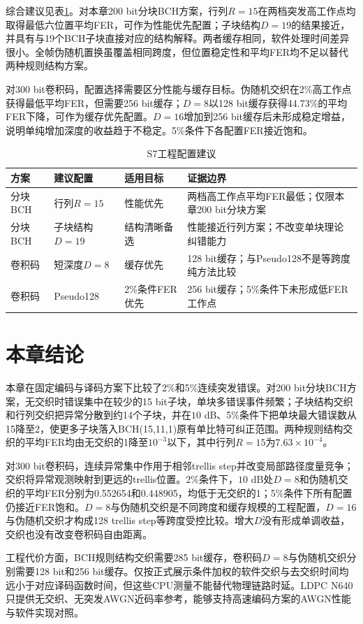 综合建议见表\ref{tab:s7-engineering-recommendation}。对本章200 bit分块BCH方案，行列$R=15$在两档突发高工作点均取得最低六位置平均FER，可作为性能优先配置；子块结构$D=19$的结果接近，并具有与19个BCH子块直接对应的结构解释。两者缓存相同，软件处理时间差异很小。全帧伪随机置换虽覆盖相同跨度，但位置稳定性和平均FER均不足以替代两种规则结构方案。

对300 bit卷积码，配置选择需要区分性能与缓存目标。伪随机交织在2\%高工作点获得最低平均FER，但需要256 bit缓存；$D=8$以128 bit缓存获得44.73\%的平均FER下降，可作为缓存优先配置。$D=16$增加到256 bit缓存后未形成稳定增益，说明单纯增加深度的收益趋于不稳定。5\%条件下各配置FER接近饱和。

\begin{table}[htbp]
  \centering
  \caption{S7工程配置建议}
  \label{tab:s7-engineering-recommendation}
  \small
  \begin{tabular}{p{}p{}p{}p{}}
    \toprule
    方案 & 建议配置 & 适用目标 & 证据边界 \\
    \midrule
    分块BCH & 行列$R=15$ & 性能优先 & 两档高工作点平均FER最低；仅限本章200 bit分块方案 \\
    分块BCH & 子块结构$D=19$ & 结构清晰备选 & 性能接近行列方案；不改变单块理论纠错能力 \\
    卷积码 & 短深度$D=8$ & 缓存优先 & 128 bit缓存；与Pseudo128不是等跨度纯方法比较 \\
    卷积码 & Pseudo128 & 2\%条件FER优先 & 256 bit缓存；5\%条件下未形成低FER工作点 \\
    \bottomrule
  \end{tabular}
\end{table}

\section{本章结论}
\enlargethispage{5\baselineskip}

本章在固定编码与译码方案下比较了2\%和5\%连续突发错误。对200 bit分块BCH方案，无交织时错误集中在较少的15 bit子块，单块多错误事件频繁；子块结构交织和行列交织把异常分散到约14个子块，并在$10$ dB、5\%条件下把单块最大错误数从15降至2，使更多子块落入BCH(15,11,1)原有单比特可纠正范围。两种规则结构交织的平均FER均由无交织的1降至$10^{-3}$以下，其中行列$R=15$为$7.63\times10^{-4}$。

对300 bit卷积码，连续异常集中作用于相邻trellis step并改变局部路径度量竞争；交织将异常观测映射到更远的trellis位置。2\%条件下，$10$ dB处$D=8$和伪随机交织的平均FER分别为0.552654和0.448905，均低于无交织的1；5\%条件下所有配置仍接近FER饱和。$D=8$与伪随机交织是不同跨度和缓存规模的工程配置，$D=16$与伪随机交织才构成128 trellis step等跨度受控比较。增大$D$没有形成单调收益，交织也没有改变卷积码自由距离。

工程代价方面，BCH规则结构交织需要285 bit缓存，卷积码$D=8$与伪随机交织分别需要128 bit和256 bit缓存。仅按正式展示条件加权的软件交织与去交织时间均远小于对应译码函数时间，但这些CPU测量不能替代物理链路时延。LDPC N640只提供无交织、无突发AWGN近码率参考，能够支持高速编码方案的AWGN性能与软件实现对照。